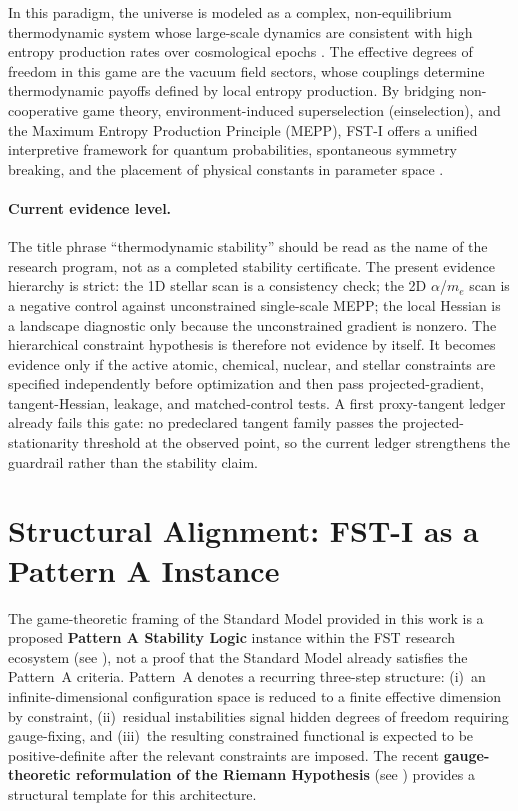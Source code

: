 \documentclass[12pt,a4paper]{article}
\theoremstyle{remark}
\begin{document}
In this paradigm, the universe is modeled as a complex, non-equilibrium thermodynamic system whose large-scale dynamics are consistent with high entropy production rates over cosmological epochs \citep{MEPP2004}. The effective degrees of freedom in this game are the vacuum field sectors, whose couplings determine thermodynamic payoffs defined by local entropy production. By bridging non-cooperative game theory, environment-induced superselection (einselection), and the Maximum Entropy Production Principle (MEPP), FST-I offers a unified interpretive framework for quantum probabilities, spontaneous symmetry breaking, and the placement of physical constants in parameter space \citep{QuantumOptimization,LasryLions2007,HiggsVEV2024}.

\paragraph{Current evidence level.} The title phrase ``thermodynamic stability'' should be read as the name of the research program, not as a completed stability certificate. The present evidence hierarchy is strict: the 1D stellar scan is a consistency check; the 2D $\alpha$/$m_e$ scan is a negative control against unconstrained single-scale MEPP; the local Hessian is a landscape diagnostic only because the unconstrained gradient is nonzero. The hierarchical constraint hypothesis is therefore not evidence by itself. It becomes evidence only if the active atomic, chemical, nuclear, and stellar constraints are specified independently before optimization and then pass projected-gradient, tangent-Hessian, leakage, and matched-control tests. A first proxy-tangent ledger already fails this gate: no predeclared tangent family passes the projected-stationarity threshold at the observed point, so the current ledger strengthens the guardrail rather than the stability claim.

\section{Structural Alignment: FST-I as a Pattern A Instance}
\label{sec:structural-alignment}

The game-theoretic framing of the Standard Model provided in this work is a proposed \textbf{Pattern A Stability Logic} instance within the FST research ecosystem (see \cite{FST-Unified2026}), not a proof that the Standard Model already satisfies the Pattern~A criteria. Pattern~A denotes a recurring three-step structure: (i)~an infinite-dimensional configuration space is reduced to a finite effective dimension by constraint, (ii)~residual instabilities signal hidden degrees of freedom requiring gauge-fixing, and (iii)~the resulting constrained functional is expected to be positive-definite after the relevant constraints are imposed. The recent \textbf{gauge-theoretic reformulation of the Riemann Hypothesis} (see \cite{GeigerRH2026c}) provides a structural template for this architecture.
\end{document}
